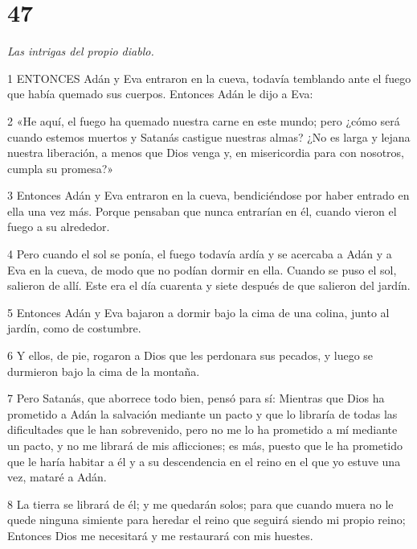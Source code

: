 \chapter{47}

\par \textit{Las intrigas del propio diablo.}

\par 1 ENTONCES Adán y Eva entraron en la cueva, todavía temblando ante el fuego que había quemado sus cuerpos. Entonces Adán le dijo a Eva:

\par 2 «He aquí, el fuego ha quemado nuestra carne en este mundo; pero ¿cómo será cuando estemos muertos y Satanás castigue nuestras almas? ¿No es larga y lejana nuestra liberación, a menos que Dios venga y, en misericordia para con nosotros, cumpla su promesa?»

\par 3 Entonces Adán y Eva entraron en la cueva, bendiciéndose por haber entrado en ella una vez más. Porque pensaban que nunca entrarían en él, cuando vieron el fuego a su alrededor.

\par 4 Pero cuando el sol se ponía, el fuego todavía ardía y se acercaba a Adán y a Eva en la cueva, de modo que no podían dormir en ella. Cuando se puso el sol, salieron de allí. Este era el día cuarenta y siete después de que salieron del jardín.

\par 5 Entonces Adán y Eva bajaron a dormir bajo la cima de una colina, junto al jardín, como de costumbre.

\par 6 Y ellos, de pie, rogaron a Dios que les perdonara sus pecados, y luego se durmieron bajo la cima de la montaña.

\par 7 Pero Satanás, que aborrece todo bien, pensó para sí: Mientras que Dios ha prometido a Adán la salvación mediante un pacto y que lo libraría de todas las dificultades que le han sobrevenido, pero no me lo ha prometido a mí mediante un pacto, y no me librará de mis aflicciones; es más, puesto que le ha prometido que le haría habitar a él y a su descendencia en el reino en el que yo estuve una vez, mataré a Adán.

\par 8 La tierra se librará de él; y me quedarán solos; para que cuando muera no le quede ninguna simiente para heredar el reino que seguirá siendo mi propio reino; Entonces Dios me necesitará y me restaurará con mis huestes.


